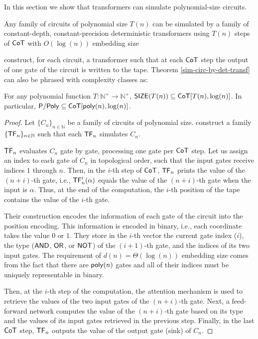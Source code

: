 In this section we show that transformers can simulate polynomial-size circuits.

\begin{theorem}\label{sim-circ-by-det-transf}
    Any family of circuits of polynomial size $T(n)$ can be simulated by a family of constant-depth, constant-precision deterministic transformers using $T(n)$ steps of $\mathsf{CoT}$ with $O(\log(n))$ embedding size 
\end{theorem}

\citet{toyota} construct, for each circuit, a transformer such that at each $\mathsf{CoT}$ step the output of one gate of the circuit is written to the tape.
Theorem \ref{sim-circ-by-det-transf} can also be phrased with complexity classes as:

\begin{theorem}\label{det-lower-bound}
    For any  polynomial function $T:\mathbb{N}^+\to \mathbb{N}^+$, $\mathsf{SIZE}(T(n)) \subseteq \mathsf{CoT} [T(n), \log(n)]$.
    In particular, $\mathsf{P/Poly} \subseteq \mathsf{CoT}[\mathsf{poly}(n), \log(n)]$.
\end{theorem}

\begin{proof}    
    Let $\{C_n\}_{n\in\mathbb{N}}$ be a family of circuits of polynomial size.
    \citet{toyota} construct a family $\{\mathsf{TF}_n\}_{n \in \mathbb{N}}$ such that each $\mathsf{TF}_n$ simulates $C_n$.
    
    $\mathsf{TF}_n$ evaluates $C_n$ gate by gate, processing one gate per $\mathsf{CoT}$ step.
    Let us assign an index to each gate of $C_n$ in topological order, such that the input gates receive indices $1$ through $n$.
    Then, in the $i$-th step of $\mathsf{CoT}$, $\mathsf{TF}_n$ prints the value of the $(n+i)$-th gate, i.e., $\mathsf{TF}_n^i(\alpha)$ equals the value of the $(n+i)$-th gate when the input is $\alpha$.
    Thus, at the end of the computation, the $i$-th position of the tape contains the value of the $i$-th gate.
    
    Their construction encodes the information of each gate of the circuit into the position encoding.
    This information is encoded in binary, i.e., each coordinate takes the value $0$ or $1$.
    They store in the $i$-th vector the current gate index ($i$), the type ($\mathsf{AND}$, $\mathsf{OR}$, or $\mathsf{NOT}$) of the $(i+1)$-th gate, and the indices of its two input gates.
    The requirement of $d(n)=\Theta(\log(n))$ embedding size comes from the fact that there are $\mathsf{poly}(n)$ gates and all of their indices must be uniquely representable in binary.
    
    Then, at the $i$-th step of the computation, the attention mechanism is used to retrieve the values of the two input gates of the $(n+i)$-th gate.
    Next, a feed-forward network computes the value of the $(n+i)$-th gate based on its type and the values of its input gates retrieved in the previous step.
    Finally, in the last $\mathsf{CoT}$ step, $\mathsf{TF}_n$ outputs the value of the output gate (sink) of $C_n$.
\end{proof}